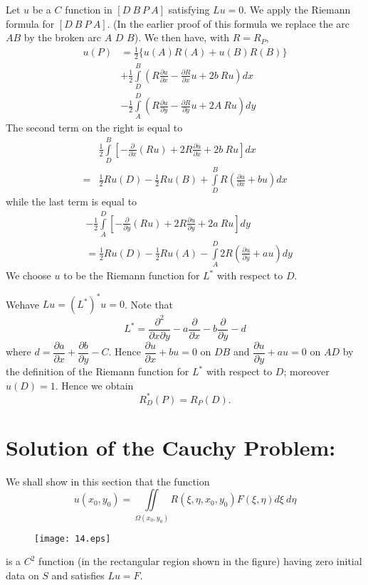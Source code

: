 Let $u$ be a $C$ function in $[D \ B \ P \ A]$ satisfying $Lu=0$. We apply the Riemann formula for $[D \ B \ P \ A]$. (In the earlier proof of this formula we replace the arc $AB$ by the broken arc $A$ $D$ $B$). We then have, with $R=R_{P}$,
\begin{align*}
u(P) &= \frac{1}{2}\{u(A)R(A)+u(B)R(B)\}\\[3pt]
&+\frac{1}{2}\int\limits^{B}_{D}\left(R\frac{\partial u}{\partial x}-\frac{\partial R}{\partial x}u+2b \ Ru\right)dx\\[4pt]
&-\frac{1}{2}\int\limits^{D}_{A}\left(R\frac{\partial u}{\partial y}-\frac{\partial R}{\partial y}u+2A \ Ru\right)dy
\end{align*}
The second term on the right is equal to
\begin{align*}
 &\frac{1}{2}\int\limits^{B}_{D}\left[-\frac{\partial}{\partial x}(Ru)+2R\frac{\partial u}{\partial x}+2b \ Ru\right]dx\\[3pt]
= & \frac{1}{2} Ru (D)-\frac{1}{2} Ru (B)+\int\limits^{B}_{D}R\left(\frac{\partial u}{\partial x}+bu\right)dx
\end{align*}
while the last term is equal to
\begin{align*}
& -\frac{1}{2}\int\limits^{D}_{A}\left[-\frac{\partial}{\partial y}(Ru)+2R\frac{\partial u}{\partial y}+2a \ Ru\right]dy\\[3pt]
&= \frac{1}{2} Ru (D)-\frac{1}{2} Ru (A) -\int\limits^{D}_{A}2R\left(\frac{\partial u}{\partial y}+au\right)dy
\end{align*}
We choose $u$ to be the Riemann function for $L^{*}$ with respect to $D$.

We\pageoriginale have $Lu=(L^{*})^{*}u=0$. Note that
$$
L^{*}=\dfrac{\partial^{2}}{\partial x\partial y}-a\frac{\partial}{\partial x}-b\frac{\partial}{\partial y}-d
$$
where $d=\dfrac{\partial a}{\partial x}+\dfrac{\partial b}{\partial y}-C$. Hence $\dfrac{\partial u}{\partial x}+bu=0$ on $DB$ and $\dfrac{\partial u}{\partial y}+au=0$ on $AD$ by the definition of the Riemann function for $L^{*}$ with respect to $D$; moreover $u(D)=1$. Hence we obtain
$$
R^{*}_{D}(P)=R_{P}(D).
$$

\section*{Solution of the Cauchy Problem:}

We shall show in this section that the function
$$
u(x_{0},y_{0})=\iint\limits_{\Omega(x_{0},y_{0})}R(\xi,\eta,x_{0},y_{0})F(\xi,\eta)d\xi \ d\eta
$$
\begin{figure}[H]
\centering
\texttt{[image: 14.eps]}
\end{figure}
\noindent
is a $C^{2}$ function (in the rectangular region shown in the figure) having zero initial data on $S$ and satisfies $Lu=F$.

